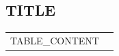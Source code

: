 \item
{}\label{SLUG}
\hypertarget{ITEM_ID}{}
\subsection*{TITLE}

\begin{longtable}{p{} p{\contentcolwidth-2\tabcolsep}}
\toprule
TABLE_CONTENT
\bottomrule
\end{longtable}
